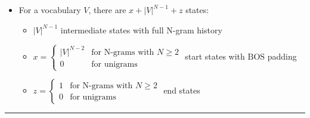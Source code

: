 \begin{itemize}
    \item For a vocabulary $V$, there are $x + |V|^{N-1} + z$ states:
    \begin{itemize}
        \item $|V|^{N-1}$ intermediate states with full N-gram history
        \item $x = \begin{cases} 
            |V|^{N-2} & \textrm{for N-grams with } N \geq 2 \\ 
            0 & \textrm{for unigrams} 
        \end{cases}$ start states with $\textrm{BOS}$ padding
        \item $z = \begin{cases} 
            1 & \textrm{for N-grams with } N \geq 2 \\ 
            0 & \textrm{for unigrams} 
        \end{cases}$ end states
    \end{itemize}
\end{itemize}

{\color{lightgray}\hrule height 0.001mm}

